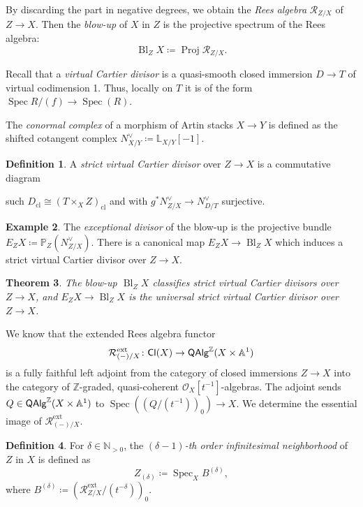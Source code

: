 \documentclass[a4paper,twoside,11pt]{amsart}
\theoremstyle{plain}
\newtheorem{theorem}{Theorem}[section]
\theoremstyle{definition}
\newtheorem{definition}[theorem]{Definition}
\newtheorem{example}[theorem]{Example}
\theoremstyle{remark}
\numberwithin{equation}{section}
\newcommand{\NN}{\mathbb{N}} %
\newcommand{\ZZ}{\mathbb{Z}} %
\newcommand{\QAlg}{\mathsf{QAlg}}
\newcommand{\PP}{\mathbb{P}} %
\DeclareMathOperator{\Spec}{Spec} %
\DeclareMathOperator{\Proj}{Proj} %
\DeclareMathOperator{\Bl}{Bl}
\newcommand{\extd}{\mathrm{ext}} %
\newcommand{\cl}{\mathrm{cl}} %
\newcommand{\oO}{\mathcal{O}}
\newcommand{\rR}{\mathcal{R}}
\newcommand{\BL}{{\mathbb{L}}}
\begin{document}
By discarding the part in negative degrees, we obtain the \emph{Rees algebra} $\rR_{Z/X}$ of $Z \to X$. Then the \emph{blow-up} of $X$ in $Z$ is the projective spectrum of the Rees algebra:
\[ \Bl_ZX \coloneqq \Proj \rR_{Z/X}. \]



Recall that a \emph{virtual Cartier divisor} is a quasi-smooth closed immersion $D \to T$ of virtual codimension 1. Thus, locally on $T$ it is of the form $\Spec R/(f) \to \Spec (R)$. 

The \emph{conormal complex} of a morphism of Artin stacks $X \to Y$ is defined as the shifted cotangent complex $N_{X/Y}^\vee \coloneqq \BL_{X/Y}[-1]$.

\begin{definition}
    A \emph{strict virtual Cartier divisor} over $Z \to X$ is a commutative diagram
    \begin{center}
    \end{center}
    such $D_\cl \cong (T \times_X Z)_\cl$ and with $g^*N_{Z/X}^\vee \to N_{D/T}^\vee$ surjective.
\end{definition}

\begin{example}
    The \emph{exceptional divisor} of the blow-up is the projective bundle $E_ZX \coloneqq \PP_Z(N^\vee_{Z/X})$. There is a canonical map $E_ZX \to \Bl_ZX$ which induces a strict virtual Cartier divisor over $Z \to X$.
\end{example}

\begin{theorem}
    The blow-up $\Bl_ZX$ classifies strict virtual Cartier divisors over $Z \to X$, and $E_ZX \to \Bl_ZX$ is the universal strict virtual Cartier divisor over $Z \to X$.
\end{theorem}

We know that the extended Rees algebra functor 
\[ \rR_{(-)/X}^\extd \colon \mathsf{Cl}(X) \to \QAlg^\ZZ(X \times \AA^1) \]
is a fully faithful left adjoint from the category of closed immersions $Z \to X$ into the category of $\ZZ$-graded, quasi-coherent $\oO_X[t^{-1}]$-algebras. The adjoint sends $Q \in \QAlg^\ZZ(X \times \AA^1)$ to $\Spec((Q/(t^{-1}))_0) \to X$. We determine the essential image of $\rR_{(-)/X}^\extd$.

\begin{definition}
\label{Def:inf_nbhd}
    For $\delta \in \NN_{>0}$, the \emph{$(\delta-1)$-th order infinitesimal neighborhood} of $Z$ in $X$ is defined as 
    \[  Z_{(\delta)} \coloneqq \Spec_X B^{(\delta)}, \]
    where $B^{(\delta)} \coloneqq (\rR_{Z/X}^{\extd}/(t^{-\delta}))_0$.
\end{definition}
\end{document}
